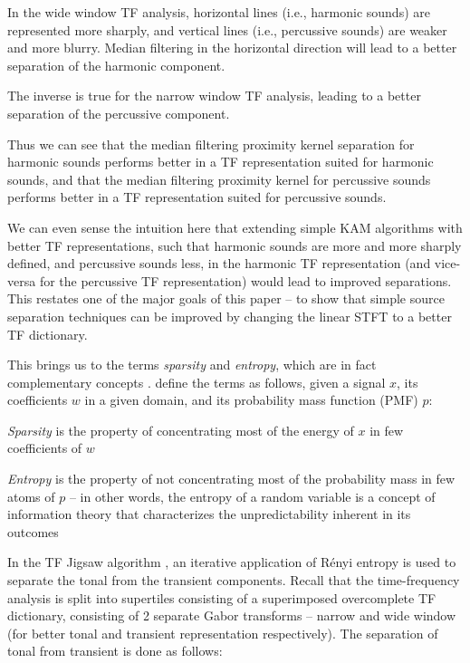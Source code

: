 \documentclass[letter,12pt]{article}
\newenvironment{tight_itemize}{
\begin{itemize}
  \setlength{\itemsep}{0pt}
  \setlength{\parskip}{0pt}
}{\end{itemize}}
\begin{document}
\begin{tight_itemize}
	\item
		In the wide window TF analysis, horizontal lines (i.e., harmonic sounds) are represented more sharply, and vertical lines (i.e., percussive sounds) are weaker and more blurry. Median filtering in the horizontal direction will lead to a better separation of the harmonic component.
	\item
		The inverse is true for the narrow window TF analysis, leading to a better separation of the percussive component.
\end{tight_itemize}

Thus we can see that the median filtering proximity kernel separation for harmonic sounds performs better in a TF representation suited for harmonic sounds, and that the median filtering proximity kernel for percussive sounds performs better in a TF representation suited for percussive sounds.

We can even sense the intuition here that extending simple KAM algorithms with better TF representations, such that harmonic sounds are more and more sharply defined, and percussive sounds less, in the harmonic TF representation (and vice-versa for the percussive TF representation) would lead to improved separations. This restates one of the major goals of this paper -- to show that simple source separation techniques can be improved by changing the linear STFT to a better TF dictionary.

This brings us to the terms \textit{sparsity} and \textit{entropy}, which are in fact complementary concepts \cite{honeine2014entropy}. \citet{pastor2015mathematics} define the terms as follows, given a signal $x$, its coefficients $w$ in a given domain, and its probability mass function (PMF) $p$:
\begin{tight_itemize}
	\item
		\textit{Sparsity} is the property of concentrating most of the energy of $x$ in few coefficients of $w$
	\item
		\textit{Entropy} is the property of not concentrating most of the probability mass in few atoms of $p$ -- in other words, the entropy of a random variable is a concept of information theory that characterizes the unpredictability inherent in its outcomes
\end{tight_itemize}

In the TF Jigsaw algorithm \cite{tfjigsaw}, an iterative application of R{\'e}nyi entropy is used to separate the tonal from the transient components. Recall that the time-frequency analysis is split into supertiles consisting of a superimposed overcomplete TF dictionary, consisting of 2 separate Gabor transforms -- narrow and wide window (for better tonal and transient representation respectively). The separation of tonal from transient is done as follows:
\end{document}
